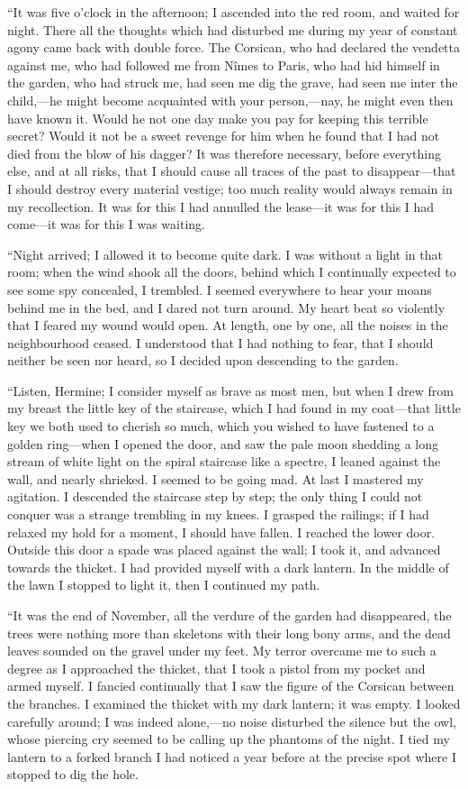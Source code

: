  “It was five o'clock in the afternoon; I ascended into the red room, and waited for night. There all the thoughts which had disturbed me during my year of constant agony came back with double force. The Corsican, who had declared the vendetta against me, who had followed me from Nîmes to Paris, who had hid himself in the garden, who had struck me, had seen me dig the grave, had seen me inter the child,—he might become acquainted with your person,—nay, he might even then have known it. Would he not one day make you pay for keeping this terrible secret? Would it not be a sweet revenge for him when he found that I had not died from the blow of his dagger? It was therefore necessary, before everything else, and at all risks, that I should cause all traces of the past to disappear—that I should destroy every material vestige; too much reality would always remain in my recollection. It was for this I had annulled the lease—it was for this I had come—it was for this I was waiting. 

 “Night arrived; I allowed it to become quite dark. I was without a light in that room; when the wind shook all the doors, behind which I continually expected to see some spy concealed, I trembled. I seemed everywhere to hear your moans behind me in the bed, and I dared not turn around. My heart beat so violently that I feared my wound would open. At length, one by one, all the noises in the neighbourhood ceased. I understood that I had nothing to fear, that I should neither be seen nor heard, so I decided upon descending to the garden. 

 “Listen, Hermine; I consider myself as brave as most men, but when I drew from my breast the little key of the staircase, which I had found in my coat—that little key we both used to cherish so much, which you wished to have fastened to a golden ring—when I opened the door, and saw the pale moon shedding a long stream of white light on the spiral staircase like a spectre, I leaned against the wall, and nearly shrieked. I seemed to be going mad. At last I mastered my agitation. I descended the staircase step by step; the only thing I could not conquer was a strange trembling in my knees. I grasped the railings; if I had relaxed my hold for a moment, I should have fallen. I reached the lower door. Outside this door a spade was placed against the wall; I took it, and advanced towards the thicket. I had provided myself with a dark lantern. In the middle of the lawn I stopped to light it, then I continued my path. 

 “It was the end of November, all the verdure of the garden had disappeared, the trees were nothing more than skeletons with their long bony arms, and the dead leaves sounded on the gravel under my feet. My terror overcame me to such a degree as I approached the thicket, that I took a pistol from my pocket and armed myself. I fancied continually that I saw the figure of the Corsican between the branches. I examined the thicket with my dark lantern; it was empty. I looked carefully around; I was indeed alone,—no noise disturbed the silence but the owl, whose piercing cry seemed to be calling up the phantoms of the night. I tied my lantern to a forked branch I had noticed a year before at the precise spot where I stopped to dig the hole. 

